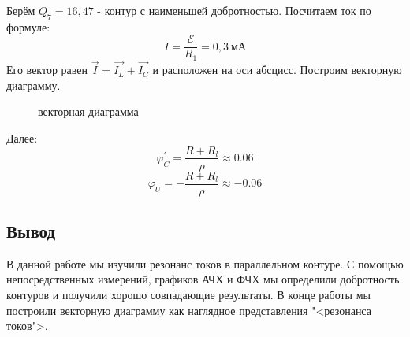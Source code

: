 \n\n
Берём $Q_7 = 16,47$ - контур с наименьшей добротностью. Посчитаем ток по формуле:
\begin{equation}
    I = \frac{\mathcal{E}}{R_1} = 0,3 \ \text{мА}
\end{equation}
Его вектор равен $\Vec{I}=\Vec{I_L} + \Vec{I_C}$ и расположен на оси абсцисс. Построим векторную диаграмму.
	\begin{figure}[H]
	\caption{\centering векторная диаграмма}
	\label{fig:image2}
\end{figure}
	\n
	Далее:
	\[\varphi^{'}_C = \frac{R + R_{l}}{\rho} \approx 0.06\]
	\[\varphi_U = - \frac{R + R_{l}}{\rho} \approx - 0.06\]
	\subsection*{Вывод}
	В данной работе мы изучили резонанс токов в параллельном контуре. С помощью непосредственных измерений, графиков АЧХ и ФЧХ мы определили добротность контуров и получили хорошо совпадающие результаты. 
\n\n
В конце работы мы построили векторную диаграмму как наглядное представления "<резонанса токов">. 

